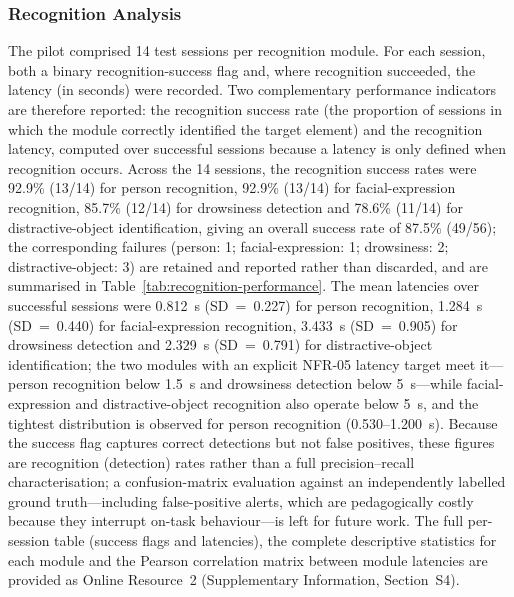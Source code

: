 \subsubsection{Recognition Analysis}
The pilot comprised 14 test sessions per recognition module. For each session, both a binary recognition-success flag and, where recognition succeeded, the latency (in seconds) were recorded. Two complementary performance indicators are therefore reported: the recognition success rate (the proportion of sessions in which the module correctly identified the target element) and the recognition latency, computed over successful sessions because a latency is only defined when recognition occurs. Across the 14 sessions, the recognition success rates were 92.9\% (13/14) for person recognition, 92.9\% (13/14) for facial-expression recognition, 85.7\% (12/14) for drowsiness detection and 78.6\% (11/14) for distractive-object identification, giving an overall success rate of 87.5\% (49/56); the corresponding failures (person: 1; facial-expression: 1; drowsiness: 2; distractive-object: 3) are retained and reported rather than discarded, and are summarised in Table~\ref{tab:recognition-performance}. The mean latencies over successful sessions were 0.812~s (SD~=~0.227) for person recognition, 1.284~s (SD~=~0.440) for facial-expression recognition, 3.433~s (SD~=~0.905) for drowsiness detection and 2.329~s (SD~=~0.791) for distractive-object identification; the two modules with an explicit NFR-05 latency target meet it---person recognition below 1.5~s and drowsiness detection below 5~s---while facial-expression and distractive-object recognition also operate below 5~s, and the tightest distribution is observed for person recognition (0.530--1.200~s). Because the success flag captures correct detections but not false positives, these figures are recognition (detection) rates rather than a full precision--recall characterisation; a confusion-matrix evaluation against an independently labelled ground truth---including false-positive alerts, which are pedagogically costly because they interrupt on-task behaviour---is left for future work. The full per-session table (success flags and latencies), the complete descriptive statistics for each module and the Pearson correlation matrix between module latencies are provided as Online Resource~2 (Supplementary Information, Section~S4).

